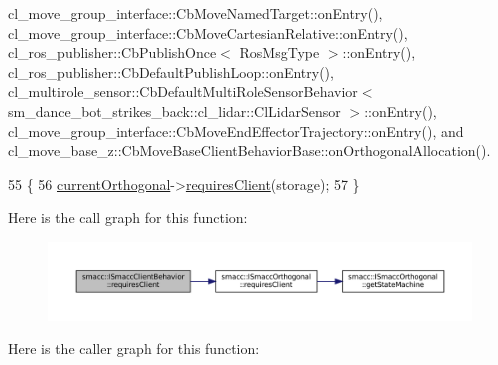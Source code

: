 cl\+\_\+move\+\_\+group\+\_\+interface\+::\+Cb\+Move\+Named\+Target\+::on\+Entry(), cl\+\_\+move\+\_\+group\+\_\+interface\+::\+Cb\+Move\+Cartesian\+Relative\+::on\+Entry(), cl\+\_\+ros\+\_\+publisher\+::\+Cb\+Publish\+Once$<$ Ros\+Msg\+Type $>$\+::on\+Entry(), cl\+\_\+ros\+\_\+publisher\+::\+Cb\+Default\+Publish\+Loop\+::on\+Entry(), cl\+\_\+multirole\+\_\+sensor\+::\+Cb\+Default\+Multi\+Role\+Sensor\+Behavior$<$ sm\+\_\+dance\+\_\+bot\+\_\+strikes\+\_\+back\+::cl\+\_\+lidar\+::\+Cl\+Lidar\+Sensor $>$\+::on\+Entry(), cl\+\_\+move\+\_\+group\+\_\+interface\+::\+Cb\+Move\+End\+Effector\+Trajectory\+::on\+Entry(), and cl\+\_\+move\+\_\+base\+\_\+z\+::\+Cb\+Move\+Base\+Client\+Behavior\+Base\+::on\+Orthogonal\+Allocation().


\begin{DoxyCode}
55 \{
56     \hyperlink{classsmacc_1_1ISmaccClientBehavior_a0d606b804769a11b4f672243a014bed8}{currentOrthogonal}->\hyperlink{classsmacc_1_1ISmaccOrthogonal_a602e16b09f8a1b3de889f2f3d90a3211}{requiresClient}(storage);
57 \}
\end{DoxyCode}
Here is the call graph for this function\+:
\nopagebreak
\begin{figure}[H]
\begin{center}
\leavevmode
\includegraphics[width=350pt]{classsmacc_1_1ISmaccClientBehavior_a32b16e99e3b4cb289414203dc861a440_cgraph}
\end{center}
\end{figure}
Here is the caller graph for this function\+:
\nopagebreak
